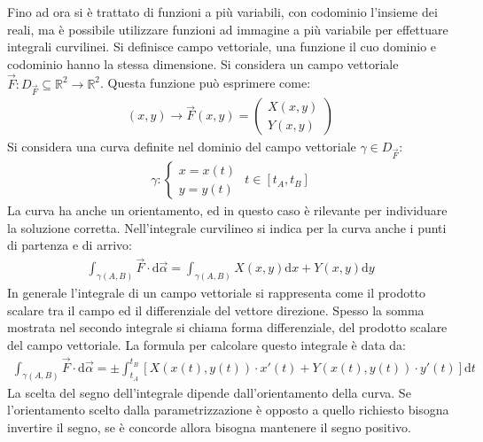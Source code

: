 \documentclass{article}
\newcommand{\df}{\mathrm{d}}
\numberwithin{equation}{subsection}
\begin{document}
Fino ad ora si è trattato di funzioni a più variabili, con codominio l'insieme dei reali, ma è possibile utilizzare funzioni ad immagine a più variabile per effettuare integrali curvilinei. Si definisce campo vettoriale, una funzione il cuo dominio e codominio hanno la stessa dimensione. 
Si considera un campo vettoriale $\vec{F}:D_{\vec{F}}\subseteq\mathbb{R}^2\to\mathbb{R}^2$. Questa funzione può esprimere come:
\begin{gather*}
    (x,y)\to\vec{F}(x,y)=\begin{pmatrix}
        X(x,y)\\Y(x,y)
    \end{pmatrix}
\end{gather*}
Si considera una curva definite nel dominio del campo vettoriale $\gamma\in D_{\vec{F}}$:
\begin{gather*}
    \gamma:\begin{cases}
        x=x(t)\\y=y(t)
    \end{cases}\,\, t\in[t_A,t_B]
\end{gather*}
La curva ha anche un orientamento, ed in questo caso è rilevante per individuare la soluzione corretta. Nell'integrale curvilineo si indica per la curva anche i punti di partenza e di arrivo:
\begin{gather*}
    \int_{\gamma(A,B)}\vec{F}\cdot\df \vec{\alpha}=\int_{\gamma(A,B)}X(x,y)\df x+Y(x,y)\df y
\end{gather*}
In generale l'integrale di un campo vettoriale si rappresenta come il prodotto scalare tra il campo ed il differenziale del vettore direzione. 
Spesso la somma mostrata nel secondo integrale si chiama forma differenziale, del prodotto scalare del campo vettoriale. 
La formula per calcolare questo integrale è data da:
\begin{gather*}
    \int_{\gamma(A,B)}\vec{F}\cdot\df \vec{\alpha}=
    \pm\int_{t_A}^{t_B}\left[X(x(t),y(t))\cdot x'(t)+Y(x(t),y(t))\cdot y'(t)\right]\df t    
\end{gather*}
La scelta del segno dell'integrale dipende dall'orientamento della curva. Se l'orientamento scelto dalla parametrizzazione è opposto a quello richiesto bisogna invertire il segno, se è concorde allora bisogna mantenere il segno positivo. 



\end{document}

